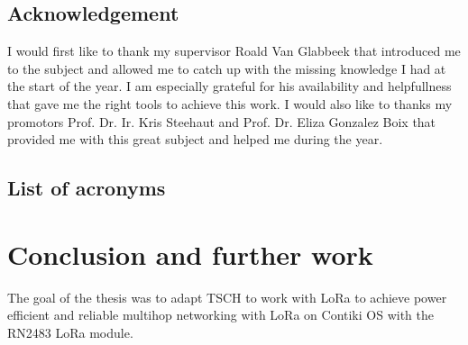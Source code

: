 \documentclass[11pt]{report}
\begin{document}
\newpage

\section*{Acknowledgement}

I would first like to thank my supervisor Roald Van Glabbeek that introduced me
to the subject and allowed me to catch up with the missing knowledge I had at
the start of the year.
I am especially grateful for his availability and helpfullness that gave me the
right tools to achieve this work.
I would also like to thanks my promotors Prof. Dr. Ir. Kris Steehaut and Prof.
Dr. Eliza Gonzalez Boix that provided me with this great subject and helped me 
during the year.


\newpage

\tableofcontents

\newpage

\listoffigures

\newpage

\section*{List of acronyms}



\newpage










\chapter{Conclusion and further work\label{section:conclusion}}

The goal of the thesis was to adapt TSCH to work with LoRa to achieve power
efficient and reliable multihop networking with LoRa on Contiki OS with the 
RN2483 LoRa module.

\paragraph{}
\end{document}
